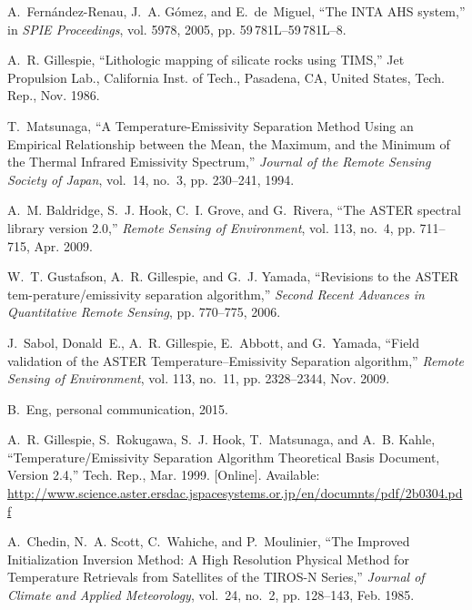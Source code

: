 \begin{thebibliography}{10}
A.~Fern\'{a}ndez-Renau, J.~A. G\'{o}mez, and E.~de~Miguel, ``The {INTA} {AHS}
  system,'' in \emph{{SPIE} {Proceedings}}, vol. 5978, 2005, pp.
  59\,781L--59\,781L--8.

A.~R. Gillespie, ``Lithologic mapping of silicate rocks using {TIMS},'' Jet
  Propulsion Lab., California Inst. of Tech., Pasadena, CA, United States,
  Tech. Rep., Nov. 1986.

T.~Matsunaga, ``A {Temperature}-{Emissivity} {Separation} {Method} {Using} an
  {Empirical} {Relationship} between the {Mean}, the {Maximum}, and the
  {Minimum} of the {Thermal} {Infrared} {Emissivity} {Spectrum},''
  \emph{Journal of the Remote Sensing Society of Japan}, vol.~14, no.~3, pp.
  230--241, 1994.

A.~M. Baldridge, S.~J. Hook, C.~I. Grove, and G.~Rivera, ``The {ASTER} spectral
  library version 2.0,'' \emph{Remote Sensing of Environment}, vol. 113, no.~4,
  pp. 711--715, Apr. 2009.

W.~T. Gustafson, A.~R. Gillespie, and G.~J. Yamada, ``Revisions to the {ASTER}
  tem-perature/emissivity separation algorithm,'' \emph{Second Recent Advances
  in Quantitative Remote Sensing}, pp. 770--775, 2006.

J.~Sabol, Donald~E., A.~R. Gillespie, E.~Abbott, and G.~Yamada, ``Field
  validation of the {ASTER} {Temperature}–{Emissivity} {Separation}
  algorithm,'' \emph{Remote Sensing of Environment}, vol. 113, no.~11, pp.
  2328--2344, Nov. 2009.

B.~Eng, personal communication, 2015.

A.~R. Gillespie, S.~Rokugawa, S.~J. Hook, T.~Matsunaga, and A.~B. Kahle,
  ``Temperature/{Emissivity} {Separation} {Algorithm} {Theoretical} {Basis}
  {Document}, {Version} 2.4,'' Tech. Rep., Mar. 1999. [Online]. Available:
  \url{http://www.science.aster.ersdac.jspacesystems.or.jp/en/documnts/pdf/2b0304.pdf}

A.~Chedin, N.~A. Scott, C.~Wahiche, and P.~Moulinier, ``The {Improved}
  {Initialization} {Inversion} {Method}: {A} {High} {Resolution} {Physical}
  {Method} for {Temperature} {Retrievals} from {Satellites} of the {TIROS}-{N}
  {Series},'' \emph{Journal of Climate and Applied Meteorology}, vol.~24,
  no.~2, pp. 128--143, Feb. 1985.


\end{thebibliography}
